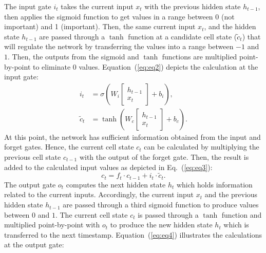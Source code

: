 \begin{sloppypar}
	The input gate \(i_{t}\) takes the current input \(x_t\) with the previous hidden state \(h_{t-1}\), then applies the sigmoid function to get values in a range between 0 (not important) and 1 (important).
	Then, the same current input \(x_t\), and the hidden state \(h_{t-1}\) are passed through a \(\tanh\) function at a candidate cell state (\(\tilde{c}_{t}\)) that will regulate the network by transferring the values into a range between \(-1\) and \(1\).
	Then, the outputs from the sigmoid and \(\tanh\) functions are multiplied point-by-point to eliminate \(0\) values.  
	Equation~(\ref{eq:eq2}) depicts the calculation at the input gate:
	\begin{equation}
		\begin{aligned}
			i_{t} &=\sigma\left(W_{i} 
			\left[
			\begin{array}{c}
				h_{t-1} \\ x_{t}
			\end{array} 
			\right]+b_{i}\right), 
			\\
			\tilde{c}_{t} &=\tanh \left(W_{c} 
			\left[
			\begin{array}{c}
				h_{t-1} \\ x_{t}
			\end{array} 
			\right]+b_{c}\right). 
		\end{aligned} \label{eq:eq2}
	\end{equation}
	At this point, the network has sufficient information obtained from the input and forget gates. 
	Hence, the current cell state \(c_{t}\) can be calculated by multiplying the previous cell state \(c_{t-1}\) with the output of the forget gate. 
	Then, the result is added to the calculated input values as depicted in Eq.~(\ref{eq:eq3}):
	\begin{equation}
		c_{t}=f_{t} \cdot c_{t-1}+i_{t} \cdot \tilde{c}_{t}.
		\label{eq:eq3}
	\end{equation}
	The output gate \(o_{t}\) computes the next hidden state \(h_{t}\) which
	holds information related to the current inputs. 
	Accordingly, the current input \(x_{t}\) and the previous hidden state \(h_{t-1}\) are passed through a third sigmoid function to produce values between \(0\) and \(1\).
	The current cell state \(c_{t}\) is passed through a \(\tanh\) function and multiplied point-by-point with \(o_{t}\) to produce the new hidden state \(h_{t}\) which is transferred to the next timestamp.
	Equation~(\ref{eq:eq4}) illustrates the calculations at the output gate:

\end{sloppypar}
